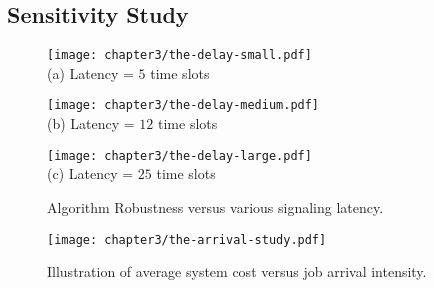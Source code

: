 \subsection{Sensitivity Study}
\label{subsec:chapter3-advance}
\begin{figure*}[ht!]                                                                %
    \centering                                                                      %
    \begin{minipage}[b]{0.65\textwidth}                                             %
        \texttt{[image: chapter3/the-delay-small.pdf]} \\         %
        (a) Latency = $5$ time slots                                                %
    \end{minipage}                                                                  %
    \begin{minipage}[b]{0.65\textwidth}                                             %
        \texttt{[image: chapter3/the-delay-medium.pdf]} \\        %
        (b) Latency = $12$ time slots                                               %
    \end{minipage}                                                                  %
    \begin{minipage}[b]{0.65\textwidth}                                             %
        \texttt{[image: chapter3/the-delay-large.pdf]} \\         %
        (c) Latency = $25$ time slots                                               %
    \end{minipage}                                                                  %
    \caption{Algorithm Robustness versus various signaling latency.}                %
    \label{fig:ss_signal}                                                           %
\end{figure*}                                                                       %


\begin{figure*}[hbt]                                                 %
    \centering                                                      %
    \texttt{[image: chapter3/the-arrival-study.pdf]}   %
    \caption{Illustration of average system cost versus job arrival intensity.}
    \label{fig:ss_scale}                                            %
\end{figure*}                                                        %

